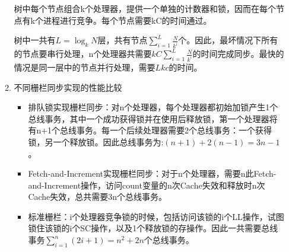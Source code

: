 \documentclass[a4paper]{ctexbook}
\begin{document}
\begin{enumerate}
\begin{enumerate}
    树中每个节点组合k个处理器，提供一个单独的计数器和锁，因而在每个节点有k个进程进行竞争。每个节点需要kC的时间通过。
    
    树中一共有$L=\log_kN$层，共有节点$\sum_{i=1}^{L}\frac{N}{k^i}$个。因此，最坏情况下所有的节点要串行处理，n个处理器共需要$kC\sum_{i=1}^{L}\frac{N}{k^i}$的时间完成同步。最快的情况是同一层中的节点并行处理，需要$Lkc$的时间。
      
    \item 不同栅栏同步实现的性能比较
    \begin{itemize}
      \item 排队锁实现栅栏同步：对n个处理器，每个处理器都初始加锁产生1个总线事务，其中一个成功获得锁并在使用后释放锁，第一个处理器将有n+1个总线事务。每一个后续处理器需要2个总线事务：一个获得锁，另一个释放锁。因此总线事务为:$(n+1)+2(n-1)=3n-1$。
      \item Fetch-and-Increment实现栅栏同步：对于n个处理器，需要n此Fetch-and-Increment操作，访问count变量的n次Cache失效和释放时n次Cache失效，总共需要3n个总线事务。
      \item 标准栅栏：i个处理器竞争锁的时候，包括访问该锁的i个LL操作，试图锁住该锁的i个SC操作，以及1个释放锁的存操作。因此一共需要总线事务$\sum_{i=1}^n(2i+1)=n^2+2n$个总线事务。
    \end{itemize}
    
  \end{enumerate}
  

\end{enumerate}
\end{document}
